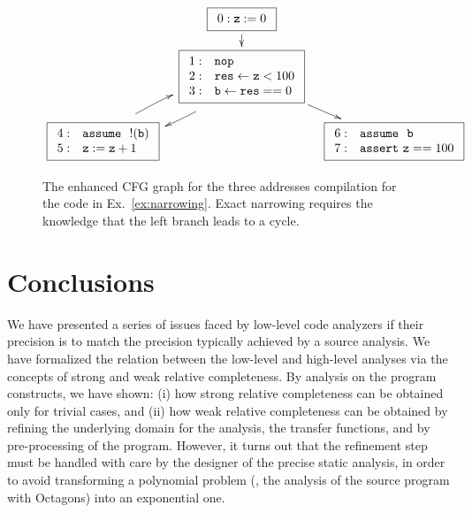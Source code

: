 \documentclass{llncs}
\begin{document}
\begin{figure}[t]
  \[
  \xymatrix @-1.2pc {
    & \fbox{$\begin{array}{rl} 0: \code{z} := 0\end{array}$} \ar[d] \\
    & \fbox{$\begin{array}{rl} 
        1: &  \Nop \\
        2 :& \result \takes \code{z} < 100 \\
        3: & \code{b} \takes \result == 0 \\
      \end{array}$} \ar[dr] \ar@/^/@<1ex> [dl] \\     
    \fbox{$\begin{array}{rl} 
        4 : & \Assume\ \code{!(b)} \\  
        5 : & \code{z} := \code{z} + 1 \end{array} $} \ar@/^/@<1ex> [ur]
    &  &\fbox{$\begin{array}{rl} 6 : & \Assume\ \code{b}\\ 7 : & \Assert \code{z} == 100 \end{array}$}  \\   
  }
  \]
\caption{The enhanced CFG graph for the three addresses compilation for the code in Ex.~\ref{ex:narrowing}.
Exact narrowing requires the knowledge that the left branch leads to a cycle.}
\label{fig:narrowing}
\end{figure}

\section{Conclusions}
We have presented a series of issues faced by low-level code analyzers
if their precision is to match the precision typically achieved by a
source analysis.
We have formalized the relation between the low-level and high-level
analyses via the concepts of strong and weak relative completeness.  
By analysis on the program constructs, we have shown: (i) how strong
relative completeness can be obtained only for trivial cases, and (ii)
how weak relative completeness can be obtained by refining
the underlying domain for the analysis, the transfer functions, and
by pre-processing of the program.  However, it turns out that
the refinement step must be handled with care by the designer of the
precise static analysis, in order to avoid transforming a polynomial
problem (\eg, the analysis of the source program with Octagons) into
an exponential one.


\small

\end{document}
